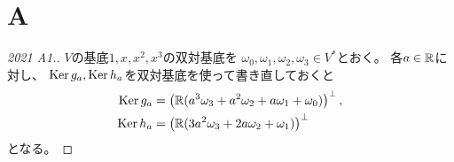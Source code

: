 \documentclass[report]{jlreq}
\begin{document}
%
\section{A}

\begin{proof}[2021 A1.]
    $V$の基底$1, x, x^2, x^3$の双対基底を
    $\omega_0, \omega_1, \omega_2, \omega_3 \in V^*$とおく。
    各$a \in \mathbb{R}$に対し、
    $\operatorname{\mathrm{Ker}} g_a, \operatorname{\mathrm{Ker}} h_a$を双対基底を使って書き直しておくと
    \begin{alignat}{1}
        \operatorname{\mathrm{Ker}} g_a
            &=
                \left({
                    \mathbb{R} (a^3 \omega_3 + a^2 \omega_2 + a \omega_1 + \omega_0)
                }\right)^\perp,
                \\
        \operatorname{\mathrm{Ker}} h_a
            &=
                \left({
                    \mathbb{R} (3a^2 \omega_3 + 2a \omega_2 + \omega_1)
                }\right)^\perp
    \end{alignat}
    となる。


\end{proof}
\end{document}
